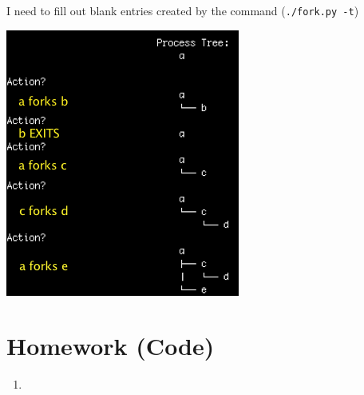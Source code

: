 \documentclass[12pt]{article}
\begin{document}
\begin{enumerate}[1.]
    I need to fill out blank entries created by the command (\texttt{./fork.py -t})

    \begin{center}
    \includegraphics[width=0.7\linewidth]{images/worksheet_2_solution_8.png}
    \end{center}
\end{enumerate}

\newpage

\section{Homework (Code)}

\begin{enumerate}[1.]
    \item
\end{enumerate}
\end{document}
